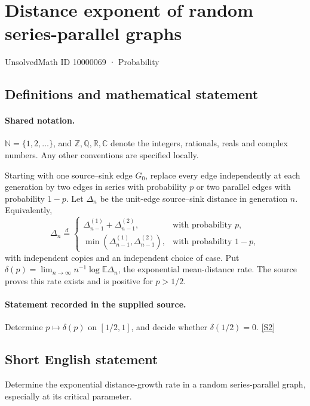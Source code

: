 \documentclass[11pt]{article}
\newcommand{\sref}[2]{\hyperlink{source:#1:#2}{[S#2]}}
\begin{document}
\setcounter{section}{10000068}
\section{Distance exponent of random series-parallel graphs}\label{10000069}
{\small\sffamily UnsolvedMath ID 10000069 · Probability}
\subsection{Definitions and mathematical statement}

\paragraph{Shared notation.}$\mathbb N=\{1,2,\ldots\}$, and $\mathbb Z,\mathbb Q,\mathbb R,\mathbb C$ denote the integers, rationals, reals and complex numbers. Any other conventions are specified locally.


Starting with one source--sink edge $G_0$, replace every edge independently at each generation by two edges in series with probability $p$ or two parallel edges with probability $1-p$. Let $\Delta_n$ be the unit-edge source--sink distance in generation $n$. Equivalently,
\[\Delta_n\stackrel d=\begin{cases}\Delta_{n-1}^{(1)}+\Delta_{n-1}^{(2)},&\text{with probability }p,\\\min(\Delta_{n-1}^{(1)},\Delta_{n-1}^{(2)}),&\text{with probability }1-p,\end{cases}\]
with independent copies and an independent choice of case. Put $\delta(p)=\lim_{n\to\infty}n^{-1}\log\mathbb E\Delta_n$, the exponential mean-distance rate. The source proves this rate exists and is positive for $p>1/2$.
\paragraph{Statement recorded in the supplied source.}
Determine $p\mapsto\delta(p)$ on $[1/2,1]$, and decide whether $\delta(1/2)=0$. \sref{10000069}{2}
\subsection{Short English statement}
Determine the exponential distance-growth rate in a random series-parallel graph, especially at its critical parameter.
\end{document}
